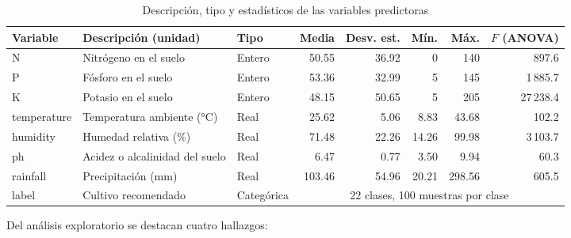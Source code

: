 \documentclass[conference]{IEEEtran}
\begin{document}
\begin{table}[htbp]
\caption{Descripción, tipo y estadísticos de las variables predictoras}
\label{tab:variables}
\centering
\footnotesize
\setlength{\tabcolsep}{4pt}
\begin{tabular}{lllrrrrr}
\toprule
\textbf{Variable} & \textbf{Descripción (unidad)} & \textbf{Tipo} & \textbf{Media} & \textbf{Desv. est.} & \textbf{Mín.} & \textbf{Máx.} & \textbf{$F$ (ANOVA)} \\
\midrule
N & Nitrógeno en el suelo & Entero & 50.55 & 36.92 & 0 & 140 & 897.6 \\
P & Fósforo en el suelo & Entero & 53.36 & 32.99 & 5 & 145 & 1\,885.7 \\
K & Potasio en el suelo & Entero & 48.15 & 50.65 & 5 & 205 & 27\,238.4 \\
temperature & Temperatura ambiente (°C) & Real & 25.62 & 5.06 & 8.83 & 43.68 & 102.2 \\
humidity & Humedad relativa (\%) & Real & 71.48 & 22.26 & 14.26 & 99.98 & 3\,103.7 \\
ph & Acidez o alcalinidad del suelo & Real & 6.47 & 0.77 & 3.50 & 9.94 & 60.3 \\
rainfall & Precipitación (mm) & Real & 103.46 & 54.96 & 20.21 & 298.56 & 605.5 \\
\midrule
label & Cultivo recomendado & Categórica & \multicolumn{5}{c}{22 clases, 100 muestras por clase} \\
\bottomrule
\end{tabular}
\end{table}

Del análisis exploratorio se destacan cuatro hallazgos:
\end{document}
